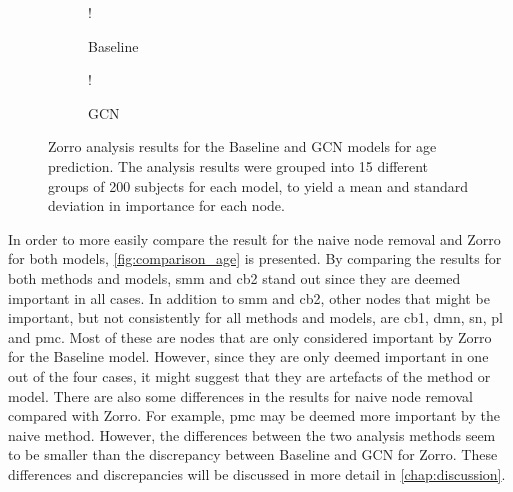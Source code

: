 \begin{figure}[!htbp]
    \centering
        \begin{subfigure}{.5\textwidth}
            \centering
            \begin{center}
                \resizebox {1.0\linewidth} {!} {
                    
                }
            \end{center}
            \caption{Baseline}
            \label{fig:zorro_age_baseline}
        \end{subfigure}%
        \begin{subfigure}{.5\textwidth}
            \centering
            \begin{center}
                \resizebox {1.0\linewidth} {!} {
                    
                }
            \end{center}
            \caption{GCN}
            \label{fig:zorro_age_gcn}
        \end{subfigure}
    \caption{Zorro analysis results for the Baseline and GCN models for age prediction. The analysis results were grouped into 15 different groups of 200 subjects for each model, to yield a mean and standard deviation in importance for each node.}
    \label{fig:zorro_age}
\end{figure}

In order to more easily compare the result for the naive node removal and Zorro for both models, \cref{fig:comparison_age} is presented. By comparing the results for both methods and models, \acrshort{smm} and \acrshort{cb2} stand out since they are deemed important in all cases. In addition to \acrshort{smm} and \acrshort{cb2}, other nodes that might be important, but not consistently for all methods and models, are \acrshort{cb1}, \acrshort{dmn}, \acrshort{sn}, \acrshort{pl} and \acrshort{pmc}. Most of these are nodes that are only considered important by Zorro for the Baseline model. However, since they are only deemed important in one out of the four cases, it might suggest that they are artefacts of the method or model.
There are also some differences in the results for naive node removal compared with Zorro. For example, \acrshort{pmc} may be deemed more important by the naive method. However, the differences between the two analysis methods seem to be smaller than the discrepancy between Baseline and GCN for Zorro. These differences and discrepancies will be discussed in more detail in \cref{chap:discussion}.

